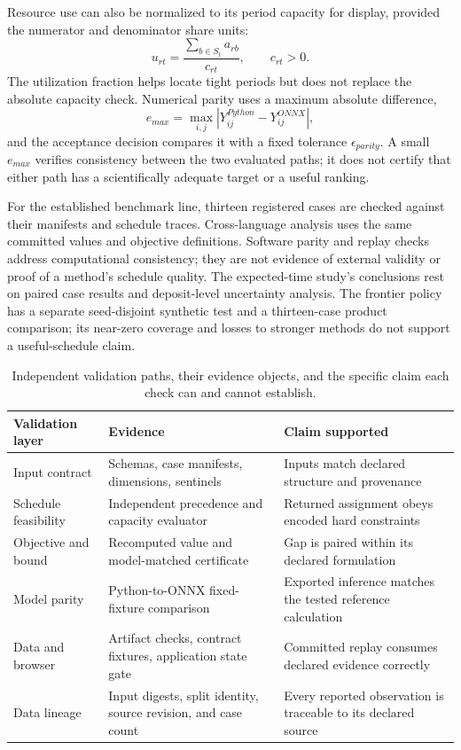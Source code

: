 Resource use can also be normalized to its period capacity for display, provided the numerator and denominator share units:
\begin{equation}
 u_{rt}=\frac{\sum_{b\in S_t}a_{rb}}{c_{rt}},\qquad c_{rt}>0.
\end{equation}
The utilization fraction helps locate tight periods but does not replace the absolute capacity check. Numerical parity uses a maximum absolute difference,
\begin{equation}
 e_{max}=\max_{i,j}|Y^{Python}_{ij}-Y^{ONNX}_{ij}|,
\end{equation}
and the acceptance decision compares it with a fixed tolerance $\epsilon_{parity}$. A small $e_{max}$ verifies consistency between the two evaluated paths; it does not certify that either path has a scientifically adequate target or a useful ranking.

For the established benchmark line, thirteen registered cases are checked against their manifests and schedule traces. Cross-language analysis uses the same committed values and objective definitions. Software parity and replay checks address computational consistency; they are not evidence of external validity or proof of a method's schedule quality. The expected-time study's conclusions rest on paired case results and deposit-level uncertainty analysis. The frontier policy has a separate seed-disjoint synthetic test and a thirteen-case product comparison; its near-zero coverage and losses to stronger methods do not support a useful-schedule claim.

\begin{table}[htbp]
\centering
\caption{Independent validation paths, their evidence objects, and the specific claim each check can and cannot establish.}
\label{tab:validation-paths}
\begin{tabular}{>{\raggedright\arraybackslash}p{}>{\raggedright\arraybackslash}p{}>{\raggedright\arraybackslash}p{}}
\toprule
Validation layer & Evidence & Claim supported \\
\midrule
Input contract & Schemas, case manifests, dimensions, sentinels & Inputs match declared structure and provenance \\
Schedule feasibility & Independent precedence and capacity evaluator & Returned assignment obeys encoded hard constraints \\
Objective and bound & Recomputed value and model-matched certificate & Gap is paired within its declared formulation \\
Model parity & Python-to-ONNX fixed-fixture comparison & Exported inference matches the tested reference calculation \\
Data and browser & Artifact checks, contract fixtures, application state gate & Committed replay consumes declared evidence correctly \\
Data lineage & Input digests, split identity, source revision, and case count & Every reported observation is traceable to its declared source \\
\bottomrule
\end{tabular}
\end{table}
